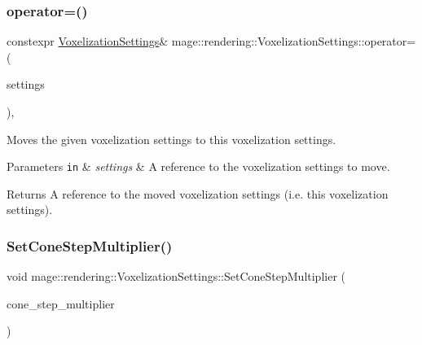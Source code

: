 \subsubsection{\texorpdfstring{operator=()}{operator=()}\hspace{0.1cm}{\footnotesize\ttfamily [2/2]}}
{\footnotesize\ttfamily constexpr \hyperlink{classmage_1_1rendering_1_1_voxelization_settings}{Voxelization\+Settings}\& mage\+::rendering\+::\+Voxelization\+Settings\+::operator= (\begin{DoxyParamCaption}\item[{\hyperlink{classmage_1_1rendering_1_1_voxelization_settings}{Voxelization\+Settings} \&\&}]{settings }\end{DoxyParamCaption})\hspace{0.3cm}{\ttfamily [default]}, {\ttfamily [noexcept]}}

Moves the given voxelization settings to this voxelization settings.


\begin{DoxyParams}[1]{Parameters}
\mbox{\tt in}  & {\em settings} & A reference to the voxelization settings to move. \\
\hline
\end{DoxyParams}
\begin{DoxyReturn}{Returns}
A reference to the moved voxelization settings (i.\+e. this voxelization settings). 
\end{DoxyReturn}
\hypertarget{classmage_1_1rendering_1_1_voxelization_settings_a9eafb3795d3e8248196dd7e9c6d32671}{}\label{classmage_1_1rendering_1_1_voxelization_settings_a9eafb3795d3e8248196dd7e9c6d32671} 
\subsubsection{\texorpdfstring{Set\+Cone\+Step\+Multiplier()}{SetConeStepMultiplier()}}
{\footnotesize\ttfamily void mage\+::rendering\+::\+Voxelization\+Settings\+::\+Set\+Cone\+Step\+Multiplier (\begin{DoxyParamCaption}\item[{\hyperlink{namespacemage_aa97e833b45f06d60a0a9c4fc22ae02c0}{F32}}]{cone\+\_\+step\+\_\+multiplier }\end{DoxyParamCaption})\hspace{0.3cm}{\ttfamily [noexcept]}}

